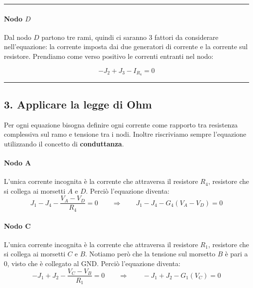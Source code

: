 \vspace{0.5cm}
\hrule
\vspace{0.5cm}

\paragraph{Nodo $D$}
\begin{minipage}[t]{0.6\textwidth}
\vspace{0pt}
Dal nodo $D$ partono tre rami, quindi ci saranno 3 fattori da considerare nell'equazione: la corrente imposta dai due generatori di corrente e la corrente sul resistore. Prendiamo come verso positivo le correnti entranti nel nodo:

\begin{equation}
- J_2 + J_3 - I_{R_4} = 0
\label{eq:nodoD}
\end{equation}
\end{minipage}
\hfill
\begin{minipage}[t]{0.3\textwidth}
\vspace{0pt}
\centering
{}
\end{minipage}


\vspace{0.5cm}
\hrule
\vspace{0.5cm}



\subsection*{3. Applicare la legge di Ohm}

Per ogni equazione bisogna definire ogni corrente come rapporto tra resistenza complessiva sul ramo e tensione tra i nodi. Inoltre riscriviamo sempre l'equazione utilizzando il concetto di \textbf{conduttanza}.

\paragraph{Nodo A}
L'unica corrente incognita è la corrente che attraversa il resistore $R_4$, resistore che si collega ai morsetti $A$ e $D$. Perciò l'equazione diventa:
\begin{equation}
J_1 - J_4 - \frac{V_A - V_D}{R_4} = 0 \qquad \Rightarrow \qquad J_1 - J_4 - G_4\left(V_A - V_D\right) = 0
\label{eq:nodoA_Ohm}
\end{equation}

\paragraph{Nodo C}
L'unica corrente incognita è la corrente che attraversa il resistore $R_1$, resistore che si collega ai morsetti $C$ e $B$. Notiamo però che la tensione sul morsetto $B$ è pari a 0, visto che è collegato al GND. Perciò l'equazione diventa:
\begin{equation}
- J_1 + J_2 - \frac{V_C - V_B}{R_1} = 0 \qquad \Rightarrow \qquad - J_1 + J_2 - G_1\left(V_C\right) = 0
\label{eq:nodoC_Ohm}
\end{equation}


